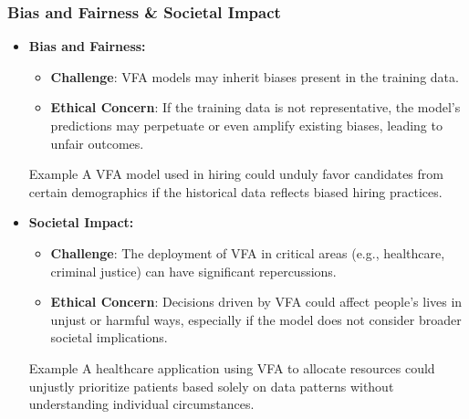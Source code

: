 \documentclass[aspectratio=169]{beamer}
\begin{document}
\begin{frame}[fragile]
    \frametitle{Bias and Fairness \& Societal Impact}
    \begin{itemize}
        \item \textbf{Bias and Fairness:}
        \begin{itemize}
            \item \textbf{Challenge}: VFA models may inherit biases present in the training data.
            \item \textbf{Ethical Concern}: If the training data is not representative, the model's predictions may perpetuate or even amplify existing biases, leading to unfair outcomes.
        \end{itemize}
        \begin{block}{Example}
            A VFA model used in hiring could unduly favor candidates from certain demographics if the historical data reflects biased hiring practices.
        \end{block}
        
        \item \textbf{Societal Impact:}
        \begin{itemize}
            \item \textbf{Challenge}: The deployment of VFA in critical areas (e.g., healthcare, criminal justice) can have significant repercussions.
            \item \textbf{Ethical Concern}: Decisions driven by VFA could affect people's lives in unjust or harmful ways, especially if the model does not consider broader societal implications.
        \end{itemize}
        \begin{block}{Example}
            A healthcare application using VFA to allocate resources could unjustly prioritize patients based solely on data patterns without understanding individual circumstances.
        \end{block}
    \end{itemize}
\end{frame}
\end{document}
